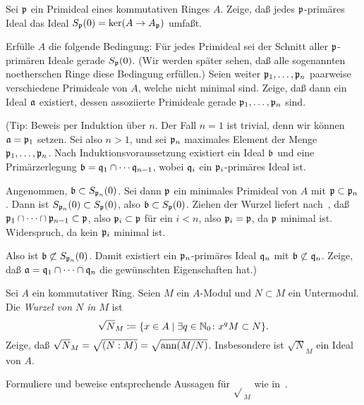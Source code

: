 \begin{exercise}
	Sei \(\mathfrak{p}\) ein Primideal eines kommutativen Ringes \(A\). Zeige, daß
	jedes \(\mathfrak{p}\)-primäres Ideal das Ideal \(S_{\mathfrak{p}}(0) = \ker
	(A \to A_{\mathfrak{p}})\) umfaßt.
	
	Erfülle \(A\) die folgende Bedingung: Für jedes Primideal sei der Schnitt
	aller \(\mathfrak{p}\)-primären Ideale gerade \(S_{\mathfrak{p}}(0)\). (Wir
	werden später sehen, daß alle sogenannten noetherschen Ringe diese Bedingung
	erfüllen.) %
	Seien weiter \(\mathfrak{p}_1, \dotsc, \mathfrak{p}_n\) paarweise verschiedene
	Primideale von \(A\), welche nicht minimal sind. Zeige, daß dann ein Ideal
	\(\mathfrak{a}\) existiert, dessen assoziierte Primideale gerade \(\mathfrak{p}_1,
	\dotsc, \mathfrak{p}_n\) sind.
	
	(Tip: Beweis per Induktion über \(n\). Der Fall \(n = 1\) ist trivial, denn
	wir können \(\mathfrak{a} = \mathfrak{p}_1\) setzen. Sei also \(n > 1\), und sei
	\(\mathfrak{p}_n\) maximales Element der Menge \(\mathfrak{p}_1, \dotsc,
	\mathfrak{p}_n\). Nach Induktionsvoraussetzung existiert ein Ideal \(\mathfrak{b}\)
	und eine Primärzerlegung \(\mathfrak{b} = \mathfrak{q}_1 \cap \dotsb
	\mathfrak{q}_{n - 1}\), wobei \(\mathfrak{q}_i\) ein \(\mathfrak{p}_i\)-primäres Ideal
	ist.
	
	Angenommen, \(\mathfrak{b} \subset S_{\mathfrak{p}_n}(0)\). Sei dann \(\mathfrak{p}\)
	ein minimales Primideal von \(A\) mit \(\mathfrak{p} \subset \mathfrak{p}_n\).
	Dann ist \(S_{\mathfrak{p}_n}(0) \subset S_{\mathfrak{p}}(0)\), also
	\(\mathfrak{b} \subset S_{\mathfrak{p}}(0)\). Ziehen der Wurzel liefert
	nach~, daß \(\mathfrak{p}_1 \cap \dotsb \cap \mathfrak{p}_{n - 1} \subset \mathfrak{p}\), also \(\mathfrak{p}_i \subset \mathfrak{p}\) für ein
	\(i < n\), also \(\mathfrak{p}_i = \mathfrak{p}\), da \(\mathfrak{p}\) minimal ist.
	Widerspruch, da kein \(\mathfrak{p}_i\) minimal ist.
	
	Also ist \(\mathfrak{b} \not\subset S_{\mathfrak{p}_n}(0)\). Damit existiert ein
	\(\mathfrak{p}_n\)-primäres Ideal \(\mathfrak{q}_n\) mit \(\mathfrak{b}
	\not\subset \mathfrak{q}_n\). Zeige, daß \(\mathfrak{a} = \mathfrak{q}_1 \cap \dotsb
	\cap \mathfrak{q}_n\) die gewünschten Eigenschaften hat.)
\end{exercise}

\begin{exercise}
	Sei \(A\) ein kommutativer Ring. Seien \(M\) ein \(A\)-Modul und
	\(N \subset M\) ein Untermodul. Die \emph{Wurzel von \(N\) in \(M\)} ist
	\[
		\sqrt{N}_M \coloneqq \{x \in A \mid \exists q \in \mathbb N_0\colon
		x^q M \subset N\}.
	\]
	Zeige, daß \(\sqrt{N}_M = \sqrt{(N : M)} = \sqrt{\operatorname{ann}(M/N)}\). Insbesondere
	ist \(\sqrt{N}_M\) ein Ideal von \(A\).
	
	Formuliere und beweise entsprechende Aussagen für \(\sqrt{}_M\) wie
	in~.
\end{exercise}

